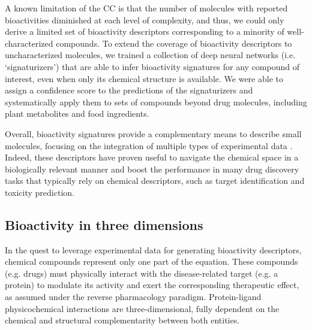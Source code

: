A known limitation of the CC is that the number of molecules with reported bioactivities diminished at each level of complexity, and thus, we could only derive a limited set of bioactivity descriptors corresponding to a minority of well-characterized compounds. To extend the coverage of bioactivity descriptors to uncharacterized molecules, we trained a collection of deep neural networks (i.e. ‘signaturizers’) that are able to infer bioactivity signatures for any compound of interest, even when only its chemical structure is available. We were able to assign a confidence score to the predictions of the signaturizers and systematically apply them to sets of compounds beyond drug molecules, including plant metabolites and food ingredients\cite{bertoni_bioactivity_2021}.

Overall, bioactivity signatures provide a complementary means to describe small molecules, focusing on the integration of multiple types of experimental data \cite{wassermann_opportunities_2015}. Indeed, these descriptors have proven useful to navigate the chemical space in a biologically relevant manner and boost the performance in many drug discovery tasks that typically rely on chemical descriptors, such as target identification and toxicity prediction\cite{bertoni_bioactivity_2021}.

\subsection{Bioactivity in three dimensions}
\label{Introduction_bioactivity}

In the quest to leverage experimental data for generating bioactivity descriptors, chemical compounds represent only one part of the equation. These compounds (e.g. drugs) must physically interact with the disease-related target (e.g. a protein) to modulate its activity and exert the corresponding therapeutic effect, as assumed under the reverse pharmacology paradigm\cite{takenaka_classical_2001, hacker_pharmacology_2009}. Protein-ligand physicochemical interactions are three-dimensional, fully dependent on the chemical and structural complementarity between both entities\cite{kitchen_docking_2004, mcgovern_specific_2003}. 

